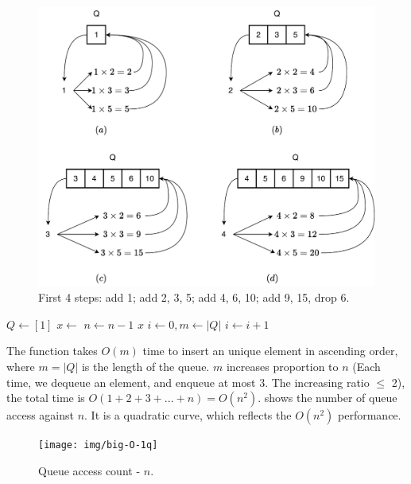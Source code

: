\documentclass[b5paper]{article}
\begin{document}
\begin{figure}[htbp]
  \centering
  \includegraphics[scale=0.5]{img/regular-num-1q}
  \caption{First 4 steps: add 1; add 2, 3, 5; add 4, 6, 10; add 9, 15, drop 6.}
  \label{fig:queues}
\end{figure}

\begin{algorithmic}[1]
  \State $Q \gets [1]$
    \State $x \gets$ 
    \State {}
    \State {}
    \State {}
    \State $n \gets n-1$
  \EndWhile
  \State \Return $x$
\EndFunction
\Statex
{}
  \State $i \gets 0, m \gets |Q|$
    \State $i \gets i + 1$
  \EndWhile
    \State {}
  \EndIf
\EndFunction
\end{algorithmic}

The  function takes $O(m)$ time to insert an unique element in ascending order, where $m = |Q|$ is the length of the queue. $m$ increases proportion to $n$ (Each time, we dequeue an element, and enqueue at most 3. The increasing ratio $\leq$ 2), the total time is $O(1 + 2 + 3 + ... + n) = O(n^2)$.  shows the number of queue access against $n$. It is a quadratic curve, which reflects the $O(n^2)$ performance.

\begin{figure}[htbp]
  \centering
  \texttt{[image: img/big-O-1q]}
  \caption{Queue access count - $n$.}
  \label{fig:big-O-1q}
\end{figure}
\end{document}
